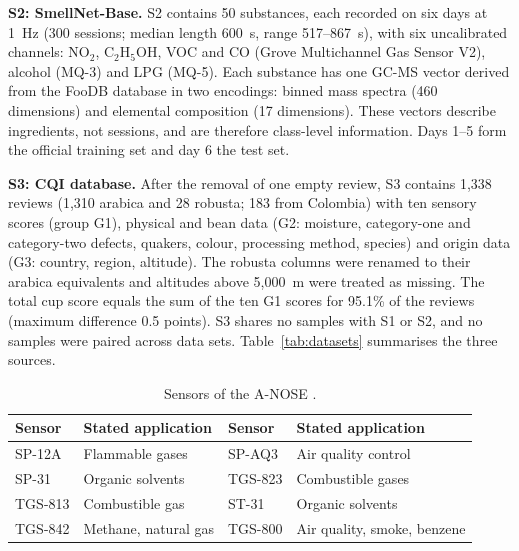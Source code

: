 \textbf{S2: SmellNet-Base.} S2 \cite{feng2026smellnet} contains 50 substances, each recorded on six days at 1~Hz (300 sessions; median length 600~s, range 517--867~s), with six uncalibrated channels: NO$_2$, C$_2$H$_5$OH, VOC and CO (Grove Multichannel Gas Sensor V2), alcohol (MQ-3) and LPG (MQ-5). Each substance has one GC-MS vector derived from the FooDB database in two encodings: binned mass spectra (460 dimensions) and elemental composition (17 dimensions). These vectors describe ingredients, not sessions, and are therefore class-level information. Days 1--5 form the official training set and day 6 the test set.

\textbf{S3: CQI database.} After the removal of one empty review, S3 \cite{ledoux2018cqi} contains 1,338 reviews (1,310 arabica and 28 robusta; 183 from Colombia) with ten sensory scores (group G1), physical and bean data (G2: moisture, category-one and category-two defects, quakers, colour, processing method, species) and origin data (G3: country, region, altitude). The robusta columns were renamed to their arabica equivalents and altitudes above 5,000~m were treated as missing. The total cup score equals the sum of the ten G1 scores for 95.1\% of the reviews (maximum difference 0.5 points). S3 shares no samples with S1 or S2, and no samples were paired across data sets. Table~\ref{tab:datasets} summarises the three sources.

\begin{table}[!htbp]
\centering
\caption[Sensors of the A-NOSE]{Sensors of the A-NOSE \cite{rodriguez2010electronic}.}
\label{tab:sensors}
\small
\begin{tabular}{llll}
\toprule
\textbf{Sensor} & \textbf{Stated application} & \textbf{Sensor} & \textbf{Stated application} \\
\midrule
SP-12A & Flammable gases & SP-AQ3 & Air quality control \\
SP-31 & Organic solvents & TGS-823 & Combustible gases \\
TGS-813 & Combustible gas & ST-31 & Organic solvents \\
TGS-842 & Methane, natural gas & TGS-800 & Air quality, smoke, benzene \\
\bottomrule
\end{tabular}
\end{table}

